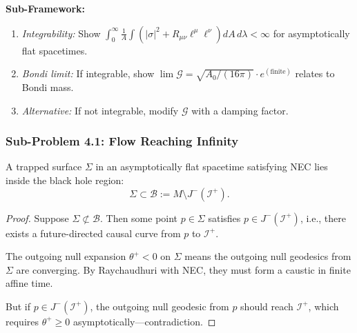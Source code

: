 \textbf{Sub-Framework:}
\begin{enumerate}
    \item[(3.3a)] \textit{Integrability:} Show $\int_0^\infty \frac{1}{A}\int(|\sigma|^2 + R_{\mu\nu}\ell^\mu\ell^\nu) dA \, d\lambda < \infty$ for asymptotically flat spacetimes.
    \item[(3.3b)] \textit{Bondi limit:} If integrable, show $\lim \mathcal{G} = \sqrt{A_0/(16\pi)} \cdot e^{(\text{finite})}$ relates to Bondi mass.
    \item[(3.3c)] \textit{Alternative:} If not integrable, modify $\mathcal{G}$ with a damping factor.
\end{enumerate}

\subsubsection{Sub-Problem 4.1: Flow Reaching Infinity}

\begin{center}
\end{center}

\begin{proposition}\label{prop:trappedinside}
A trapped surface $\Sigma$ in an asymptotically flat spacetime satisfying NEC lies inside the black hole region:
\begin{equation}
    \Sigma \subset \mathcal{B} := M \setminus J^-(\mathscr{I}^+).
\end{equation}
\end{proposition}

\begin{proof}
Suppose $\Sigma \not\subset \mathcal{B}$. Then some point $p \in \Sigma$ satisfies $p \in J^-(\mathscr{I}^+)$, i.e., there exists a future-directed causal curve from $p$ to $\mathscr{I}^+$.

The outgoing null expansion $\theta^+ < 0$ on $\Sigma$ means the outgoing null geodesics from $\Sigma$ are converging. By Raychaudhuri with NEC, they must form a caustic in finite affine time.

But if $p \in J^-(\mathscr{I}^+)$, the outgoing null geodesic from $p$ should reach $\mathscr{I}^+$, which requires $\theta^+ \geq 0$ asymptotically---contradiction.
\end{proof}

